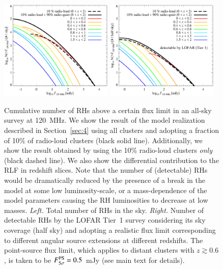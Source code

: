 \documentclass[useAMS,usenatbib]{mn2e}
\begin{document}
\begin{figure} 
\centering
\includegraphics[width=0.48\textwidth]{figures/RLF_LOFAR_flux.eps}
\includegraphics[width=0.48\textwidth]{figures/RLF_LOFAR_flux_detectable.eps}
\caption{Cumulative number of RHs above a certain flux limit in an all-sky
  survey at 120~MHz. We show the result of the model realization described in
  Section~\ref{sec:4} using all clusters and adopting a fraction of 10\% of
  radio-loud clusters (black solid line). Additionally, we show the result
  obtained by using the 10\% radio-loud clusters \emph{only} (black dashed
  line). We also show the differential contribution to the RLF in redshift
  slices. Note that the number of (detectable) RHs would be dramatically reduced
  by the presence of a break in the model at some low luminosity-scale, or a
  mass-dependence of the model parameters causing the RH luminosities to
  decrease at low masses.  \emph{Left.} Total number of RHs in the sky.
  \emph{Right.} Number of detectable RHs by the LOFAR Tier~1 survey considering
  its sky coverage (half sky) and adopting a realistic flux limit corresponding
  to different angular source extensions at different redshifts. The
  point-source flux limit, which applies to distant clusters with $z\gtrsim0.6$,
  is taken to be $F_{5\sigma}^{{\mathrm{PS}}}=0.5$~mJy (see main text for details).
}
\label{fig:RLF_120_flux}
\end{figure}
\end{document}
